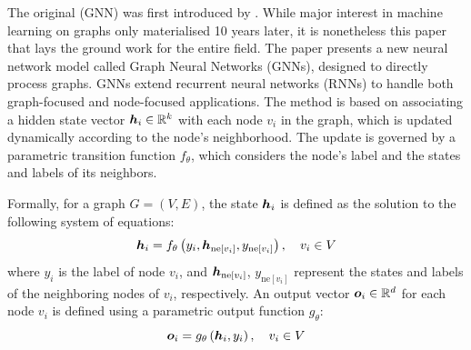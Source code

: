 The original  (GNN) was first introduced by \cite{gori_new_2005}. While major interest in machine learning on graphs only materialised 10 years later, it is nonetheless this paper that lays the ground work for the entire field. The paper presents a new neural network model called Graph Neural Networks (GNNs), designed to directly process graphs. GNNs extend recurrent neural networks (RNNs) to handle both graph-focused and node-focused applications. The method is based on associating a hidden state vector \( \bm{h}_i \in \mathbb{R}^k \) with each node \( v_i \) in the graph, which is updated dynamically according to the node's neighborhood. The update is governed by a parametric transition function \( f_\theta \), which considers the node's label and the states and labels of its neighbors.

Formally, for a graph \( G = (V, E) \), the state \( \bm{h}_i \) is defined as the solution to the following system of equations:
\begin{equation}\label{eq:gori-state}
	\bm{h}_i = f_\theta \left( y_i, \bm{h}_{\mathrm{ne}[v_i]}, y_{\mathrm{ne}[v_i]} \right) , \quad v_i \in V
\end{equation}
where \( y_i \) is the label of node \( v_i \), and \( \bm{h}_{\mathrm{ne}[v_i]} \), \( y_{\mathrm{ne}[v_i]} \) represent the states and labels of the neighboring nodes of \( v_i \), respectively. An output vector \( \bm{o}_i \in \mathbb{R}^d \) for each node \( v_i \) is defined using a parametric output function \( g_\theta \):
\begin{equation}\label{eq:gori-output}
	\bm{o}_i = g_\theta \left( \bm{h}_i, y_i \right) , \quad v_i \in V
\end{equation}

